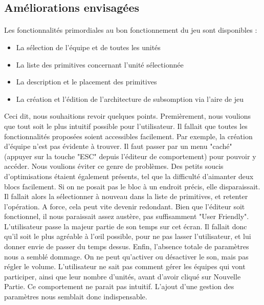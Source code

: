 \documentclass{report}
\begin{document}
\subsection{Améliorations envisagées}
\paragraph{}
Les fonctionnalités primordiales au bon fonctionnement du jeu sont disponibles :
\begin{itemize}
\item La sélection de l’équipe et de toutes les unités 
\item La liste des primitives concernant l’unité sélectionnée 
\item La description et le placement des primitives 
\item La création et l’édition de l’architecture de subsomption via l’aire de jeu
\end{itemize}

Ceci dit, nous souhaitions revoir quelques points. \newline
Premièrement, nous voulions que tout soit le plus intuitif possible pour l'utilisateur. Il fallait que toutes les fonctionnalités proposées soient accessibles facilement. Par exemple, la création d'équipe n'est pas évidente à trouver. Il faut passer par un menu "caché" (appuyer sur la touche "ESC" depuis l'éditeur de comportement) pour pouvoir y accéder. Nous voulions éviter ce genre de problèmes. Des petits soucis d'optimisations étaient également présents, tel que la difficulté d'aimanter deux blocs facilement. Si on ne posait pas le bloc à un endroit précis, elle disparaissait. Il fallait alors la sélectionner à nouveau dans la liste de primitives, et retenter l'opération. A force, cela peut vite devenir redondant.
\newline
\smallbreak
Bien que l'éditeur soit fonctionnel, il nous paraissait assez austère, pas suffisamment "User Friendly". L'utilisateur passe la majeur partie de son temps sur cet écran. Il fallait donc qu'il soit le plus agréable à l’œil possible, pour ne pas lasser l'utilisateur, et lui donner envie de passer du temps dessus.\newline \smallbreak
Enfin, l'absence totale de paramètres nous a semblé dommage. On ne peut qu'activer ou désactiver le son, mais pas régler le volume. L'utilisateur ne sait pas comment gérer les équipes qui vont participer, ainsi que leur nombre d'unités, avant d'avoir cliqué sur Nouvelle Partie. Ce comportement ne parait pas intuitif. L'ajout d'une gestion des paramètres nous semblait donc indispensable.
\end{document}
